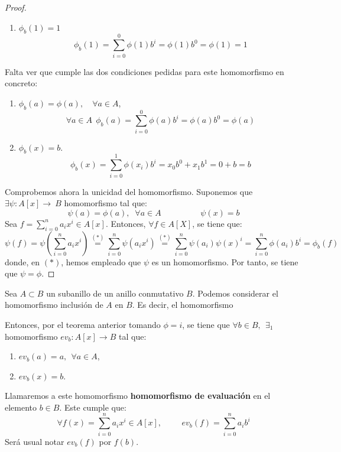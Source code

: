\begin{proof}
\begin{enumerate}
        \item $\phi_b(1)=1$
        $$\phi_b(1) = \sum_{i=0}^0 \phi(1) b^i = \phi(1) b^0 = \phi(1) = 1$$
    \end{enumerate}
    
    Falta ver que cumple las dos condiciones pedidas para este homomorfismo en concreto:
    \begin{enumerate}
        \item $\phi_b(a) = \phi(a), \quad \forall a\in A$,
        $$\forall a \in A~~\phi_b(a) = \sum_{i=0}^0 \phi(a) b^i = \phi(a) b^0 = \phi(a)$$
        \item $\phi_b(x) = b$.
        $$\phi_b(x) = \sum_{i=0}^1 \phi(x_i) b^i = x_0 b^0 + x_1 b^1 = 0 + b = b$$
    \end{enumerate}
    
    Comprobemos ahora la unicidad del homomorfismo. Suponemos que $\exists \psi:A[x]\longrightarrow~B$ homomorfismo tal que:
    $$\psi(a) = \phi(a), \;\; \forall a \in A
    \hspace{2cm}
    \psi(x) = b
    $$
    Sea $f=\sum\limits_{i=0}^n a_ix^i \in A[x]$. Entonces, $\forall f\in A[X]$, se tiene que:
    \begin{equation*}
        \psi(f) = \psi\left( \sum_{i=0}^n a_i x^i \right) \stackrel{(\ast)}{=} \sum_{i=0}^n \psi(a_i x^i) \stackrel{(\ast)}{=} \sum_{i=0}^n \psi(a_i)\psi(x)^i =\sum_{i=0}^n \phi(a_i) b^i = \phi_b(f)
    \end{equation*}
    donde, en $(\ast)$, hemos empleado que $\psi$ es un homomorfismo. Por tanto, se tiene que $\psi = \phi$.
\end{proof}

\begin{definicion}
    Sea $A\subset B$ un subanillo de un anillo conmutativo $B$. Podemos considerar el homomorfismo inclusión de $A$ en $B$. Es decir, el homomorfismo
    
    Entonces, por el teorema anterior tomando $\phi=i$, se tiene que $\forall b \in B,~~\exists_1$ homomorfismo $ev_b:A[x]\longrightarrow B$ tal que:
    \begin{enumerate}
        \item $ev_b(a) = a,~~\forall a \in A$,
        \item $ev_b(x) = b$.
    \end{enumerate}
    
    Llamaremos a este homomorfismo \textbf{homomorfismo de evaluación} en el elemento $b \in B$. Este cumple que:
    $$\forall f(x) = \sum_{i=0}^n a_ix^i \in A[x], \hspace{1cm} ev_b(f) = \sum_{i=0}^n a_i b^i$$
    Será usual notar $ev_b(f)$ por $f(b)$.
\end{definicion}

